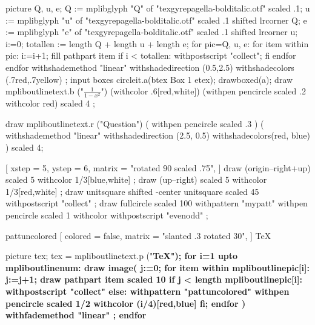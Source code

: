 \documentclass{article}
\begin{document}
\leavevmode
\mpfig[alt=fig example 1]
picture Q, u, e;
Q := mplibglyph "Q" of "texgyrepagella-bolditalic.otf" scaled .1;
u := mplibglyph "u" of "texgyrepagella-bolditalic.otf" scaled .1 shifted lrcorner Q;
e := mplibglyph "e" of "texgyrepagella-bolditalic.otf" scaled .1 shifted lrcorner u;
i:=0;
totallen := length Q + length u + length e;
for pic=Q, u, e:
  for item within pic:
    i:=i+1;
    fill pathpart item
    if i < totallen: withpostscript "collect"; fi
  endfor
endfor
  withshademethod "linear"
  withshadedirection (0.5,2.5)
  withshadecolors (.7red,.7yellow)
  ;
\endmpfig
{}%
\mpfig*[alt=fig example 2] input boxes \endmpfig
\mpfig[alt=fig example 3] circleit.a(btex Box 1 etex); drawboxed(a); \endmpfig
\def\mpfiginstancename{mympfig}%
\mpfig[alt=fig example 4]
draw mpliboutlinetext.b ("$\displaystyle\frac{1}{1-x^2}$")
    (withcolor .6[red,white])
    (withpen pencircle scaled .2 withcolor red)
    scaled 4 ;
\endmpfig
\par
\mpfig[alt=fig example 5]
  draw mpliboutlinetext.r
    ("Question")
    ( withpen pencircle scaled .3 )
    (
      withshademethod "linear"
      withshadedirection (2.5, 0.5)
      withshadecolors(red, blue)
    )
    scaled 4;
\endmpfig
\par\leavevmode
{}
[
  xstep = 5, ystep = 6,
  matrix = "rotated 90 scaled .75",
]
\mpfig[alt=fig example 6]
draw (origin--right+up) scaled 5 withcolor 1/3[blue,white] ;
draw (up--right) scaled 5 withcolor 1/3[red,white] ;
\endmpfig
\endmppattern
\mpfig[alt=fig example 7]
draw unitsquare shifted -center unitsquare scaled 45 withpostscript "collect" ;
draw fullcircle scaled 100 withpattern "mypatt" withpen pencircle scaled 1
  withcolor  withpostscript "evenodd" ;
\endmpfig
\begin{mppattern}{pattuncolored}
  [
    colored = false,
    matrix = "slanted .3 rotated 30",
  ]
  \tiny\TeX
\end{mppattern}\relax
\mpfig[alt=fig example 8]
  picture tex;
  tex = mpliboutlinetext.p ("\bfseries \TeX");
  for i=1 upto mpliboutlinenum:
    draw image(
    j:=0;
    for item within mpliboutlinepic[i]:
      j:=j+1;
      draw pathpart item scaled 10
      if j < length mpliboutlinepic[i]:
          withpostscript "collect"
      else:
          withpattern "pattuncolored"
          withpen pencircle scaled 1/2
          withcolor (i/4)[red,blue]
      fi;
    endfor
    )
    withfademethod "linear"
    ;
  endfor
\endmpfig
\end{document}

